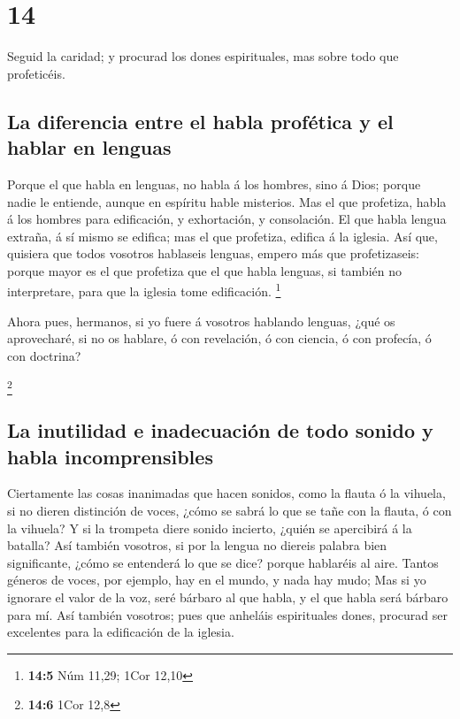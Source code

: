 \hypertarget{section-13}{%
\section{14}\label{section-13}}

 Seguid la caridad; y procurad los dones espirituales, mas
sobre todo que profeticéis.

\hypertarget{la-diferencia-entre-el-habla-profuxe9tica-y-el-hablar-en-lenguas}{%
\subsection{La diferencia entre el habla profética y el hablar en
lenguas}\label{la-diferencia-entre-el-habla-profuxe9tica-y-el-hablar-en-lenguas}}

 Porque el que habla en lenguas, no habla á los hombres,
sino á Dios; porque nadie le entiende, aunque en espíritu hable
misterios.  Mas el que profetiza, habla á los hombres para
edificación, y exhortación, y consolación.  El que habla
lengua extraña, á sí mismo se edifica; mas el que profetiza, edifica á
la iglesia.  Así que, quisiera que todos vosotros hablaseis
lenguas, empero más que profetizaseis: porque mayor es el que profetiza
que el que habla lenguas, si también no interpretare, para que la
iglesia tome edificación. \footnote{\textbf{14:5} Núm 11,29; 1Cor 12,10}

 Ahora pues, hermanos, si yo fuere á vosotros hablando
lenguas, ¿qué os aprovecharé, si no os hablare, ó con revelación, ó con
ciencia, ó con profecía, ó con doctrina?

\footnote{\textbf{14:6} 1Cor 12,8}

\hypertarget{la-inutilidad-e-inadecuaciuxf3n-de-todo-sonido-y-habla-incomprensibles}{%
\subsection{La inutilidad e inadecuación de todo sonido y habla
incomprensibles}\label{la-inutilidad-e-inadecuaciuxf3n-de-todo-sonido-y-habla-incomprensibles}}

 Ciertamente las cosas inanimadas que hacen sonidos, como la
flauta ó la vihuela, si no dieren distinción de voces, ¿cómo se sabrá lo
que se tañe con la flauta, ó con la vihuela?  Y si la
trompeta diere sonido incierto, ¿quién se apercibirá á la batalla?
 Así también vosotros, si por la lengua no diereis palabra
bien significante, ¿cómo se entenderá lo que se dice? porque hablaréis
al aire.  Tantos géneros de voces, por ejemplo, hay en el
mundo, y nada hay mudo;  Mas si yo ignorare el valor de la
voz, seré bárbaro al que habla, y el que habla será bárbaro para mí.
 Así también vosotros; pues que anheláis espirituales
dones, procurad ser excelentes para la edificación de la iglesia.

